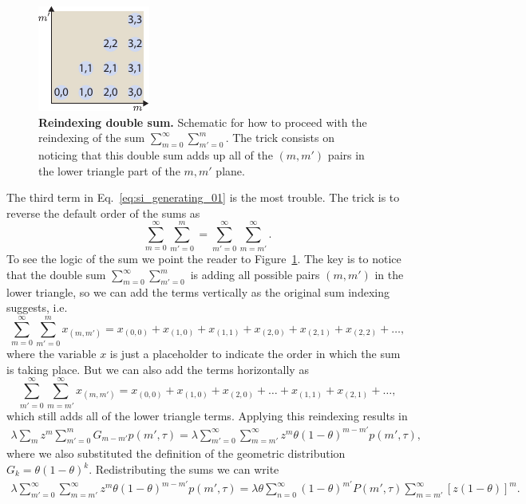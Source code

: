 \begin{figure}[h!]
\centering
\includegraphics{../figures/si/figS0X_reindex_sum.pdf}
\caption{\textbf{Reindexing double sum.} Schematic for how to proceed with the
reindexing of the sum $\sum_{m=0}^\infty \sum_{m'=0}^m$. The trick consists on
noticing that this double sum adds up all of the $(m, m')$ pairs in the lower
triangle part of the $m, m'$ plane.}
\label{figS2:sum_reindex}
\end{figure}

The third term in Eq.~\ref{eq:si_generating_01} is the most trouble. The trick
is to reverse the default order of the sums as
\begin{equation}
\sum_{m=0}^{\infty} \sum_{m'=0}^{m} = \sum_{m'=0}^{\infty} \sum_{m=m'}^{\infty}.
\end{equation}
To see the logic of the sum we point the reader to
Figure~\ref{figS2:sum_reindex}. The key is to notice that the double sum
$\sum_{m=0}^\infty \sum_{m'=0}^m$ is adding all possible pairs $(m, m')$ in the
lower triangle, so we can add the terms vertically as the original sum
indexing suggests, i.e.
\begin{equation}
\sum_{m=0}^{\infty} \sum_{m'=0}^{m} x_{(m, m')}= 
x_{(0, 0)} + x_{(1, 0)} + x_{(1, 1)} + x_{(2, 0)} + x_{(2, 1)} + x_{(2, 2)} + 
\ldots,
\end{equation}
where the variable $x$ is just a placeholder to indicate the order in which the
sum is taking place. But we can also add the terms horizontally as
\begin{equation}
\sum_{m'=0}^{\infty} \sum_{m=m'}^{\infty} x_{(m, m')} =
x_{(0, 0)} + x_{(1, 0)} + x_{(2, 0)} + \ldots + x_{(1,1)} + x_{(2, 1)} + \ldots,
\end{equation}
which still adds all of the lower triangle terms. Applying this reindexing
results in
\begin{align}
\lambda \sum_m z^m \sum_{m'=0}^m G_{m-m'} p(m', \tau) =
\lambda \sum_{m'=0}^{\infty} \sum_{m=m'}^{\infty} z^m 
\theta (1 - \theta)^{m-m'} p(m', \tau),
\end{align}
where we also substituted the definition of the geometric distribution $G_{k} =
\theta (1 - \theta)^k$. Redistributing the sums we can write
\begin{align}
\lambda \sum_{m'=0}^{\infty} \sum_{m=m'}^{\infty} z^m 
\theta (1 - \theta)^{m-m'} p(m', \tau) = 
\lambda \theta \sum_{n=0}^{\infty}(1-\theta)^{m'} P(m', \tau) 
\sum_{m=m'}^{\infty} \left[z (1-\theta)\right]^{m}.
\label{eq:si_generating_02}
\end{align}

